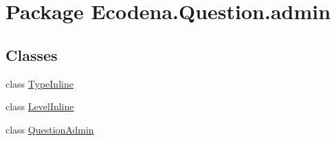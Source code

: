 \hypertarget{namespace_ecodena_1_1_question_1_1admin}{
\section{Package Ecodena.Question.admin}
\label{dd/d62/namespace_ecodena_1_1_question_1_1admin}
}
\subsection*{Classes}
\begin{DoxyCompactItemize}
\item 
class \hyperlink{class_ecodena_1_1_question_1_1admin_1_1_type_inline}{TypeInline}
\item 
class \hyperlink{class_ecodena_1_1_question_1_1admin_1_1_level_inline}{LevelInline}
\item 
class \hyperlink{class_ecodena_1_1_question_1_1admin_1_1_question_admin}{QuestionAdmin}
\end{DoxyCompactItemize}
